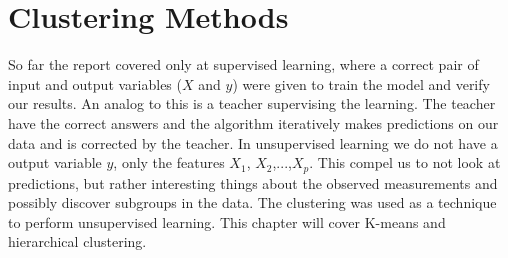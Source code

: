 \chapter{Clustering Methods} \label{ch:clusteringMethods}
So far the report covered only at supervised learning, where a correct pair of input and output variables ($X$ and $y$) were given to train the model and verify our results. An analog to this is a teacher supervising the learning. The teacher have the correct answers and the algorithm iteratively makes predictions on our data and is corrected by the teacher. In unsupervised learning we do not have a output variable $y$, only the features $X_1$, $X_2$,...,$X_p$. This compel us to not look at predictions, but rather interesting things about the observed measurements and possibly discover subgroups in the data. The clustering was used as a technique to perform unsupervised learning. This chapter will cover K-means and hierarchical clustering.



